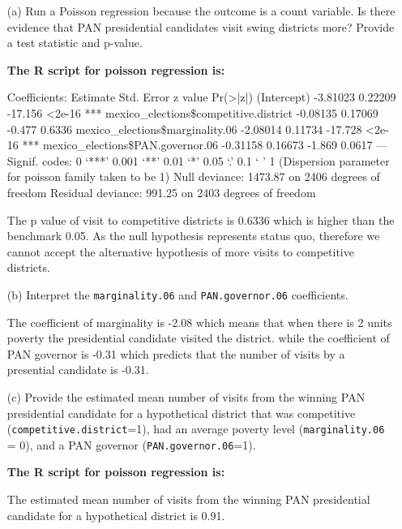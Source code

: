 \documentclass[12pt,letterpaper]{article}
\begin{document}
\begin{enumerate}
	\item [(a)]
	Run a Poisson regression because the outcome is a count variable. Is there evidence that PAN presidential candidates visit swing districts more? Provide a test statistic and p-value.

	\textbf{		The R script for poisson regression is:}
	
	
	Coefficients: \newline                                     
	Estimate Std. Error z value Pr(>|z|)   \newline 
	(Intercept)                     -3.81023    0.22209 -17.156   <2e-16 ***\newline
	 mexico\_elections\$competitive.district -0.08135    0.17069  -0.477   0.6336   \newline mexico\_elections\$marginality.06       -2.08014    0.11734 -17.728   <2e-16 *** \newline
	 mexico\_elections\$PAN.governor.06      -0.31158    0.16673  -1.869   0.0617 \newline 
	 ---Signif. codes:  0 ‘***’ 0.001 ‘**’ 0.01 ‘*’ 0.05 ‘.’ 0.1 ‘ ’ 1 \newline
	 (Dispersion parameter for poisson family taken to be 1)   \newline
	  Null deviance: 1473.87  on 2406  degrees of freedom\newline
	  Residual deviance:  991.25  on 2403  degrees of freedom
	
	The p value of visit to competitive districts is 0.6336 which is higher than the benchmark 0.05. As the null hypothesis represents status quo, therefore we cannot accept the alternative hypothesis of more visits to competitive districts. 
	
	\item [(b)]
	Interpret the \texttt{marginality.06} and \texttt{PAN.governor.06} coefficients.
	
	The coefficient of marginality is -2.08 which means that when there is 2 units poverty the presidential candidate visited the district. while the coefficient of PAN governor is -0.31 which predicts that the number of visits by a presential candidate is -0.31.
	
	\newpage
	
	\item [(c)]
	Provide the estimated mean number of visits from the winning PAN presidential candidate for a hypothetical district that was competitive (\texttt{competitive.district}=1), had an average poverty level (\texttt{marginality.06} = 0), and a PAN governor (\texttt{PAN.governor.06}=1).
	
	\textbf{		The R script for poisson regression is:}
	
	
	The estimated mean number of visits from the winning PAN presidential candidate for a hypothetical district is 0.91.
	
\end{enumerate}
\end{document}
